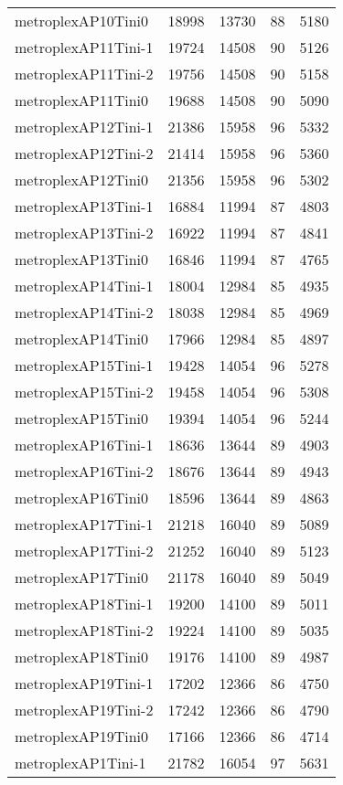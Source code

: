 \begin{longtable}{lrrrr}
metroplexAP10Tini0 & 18998 & 13730 & 88 & 5180 \\
metroplexAP11Tini-1 & 19724 & 14508 & 90 & 5126 \\
metroplexAP11Tini-2 & 19756 & 14508 & 90 & 5158 \\
metroplexAP11Tini0 & 19688 & 14508 & 90 & 5090 \\
metroplexAP12Tini-1 & 21386 & 15958 & 96 & 5332 \\
metroplexAP12Tini-2 & 21414 & 15958 & 96 & 5360 \\
metroplexAP12Tini0 & 21356 & 15958 & 96 & 5302 \\
metroplexAP13Tini-1 & 16884 & 11994 & 87 & 4803 \\
metroplexAP13Tini-2 & 16922 & 11994 & 87 & 4841 \\
metroplexAP13Tini0 & 16846 & 11994 & 87 & 4765 \\
metroplexAP14Tini-1 & 18004 & 12984 & 85 & 4935 \\
metroplexAP14Tini-2 & 18038 & 12984 & 85 & 4969 \\
metroplexAP14Tini0 & 17966 & 12984 & 85 & 4897 \\
metroplexAP15Tini-1 & 19428 & 14054 & 96 & 5278 \\
metroplexAP15Tini-2 & 19458 & 14054 & 96 & 5308 \\
metroplexAP15Tini0 & 19394 & 14054 & 96 & 5244 \\
metroplexAP16Tini-1 & 18636 & 13644 & 89 & 4903 \\
metroplexAP16Tini-2 & 18676 & 13644 & 89 & 4943 \\
metroplexAP16Tini0 & 18596 & 13644 & 89 & 4863 \\
metroplexAP17Tini-1 & 21218 & 16040 & 89 & 5089 \\
metroplexAP17Tini-2 & 21252 & 16040 & 89 & 5123 \\
metroplexAP17Tini0 & 21178 & 16040 & 89 & 5049 \\
metroplexAP18Tini-1 & 19200 & 14100 & 89 & 5011 \\
metroplexAP18Tini-2 & 19224 & 14100 & 89 & 5035 \\
metroplexAP18Tini0 & 19176 & 14100 & 89 & 4987 \\
metroplexAP19Tini-1 & 17202 & 12366 & 86 & 4750 \\
metroplexAP19Tini-2 & 17242 & 12366 & 86 & 4790 \\
metroplexAP19Tini0 & 17166 & 12366 & 86 & 4714 \\
metroplexAP1Tini-1 & 21782 & 16054 & 97 & 5631 \\

\end{longtable}
